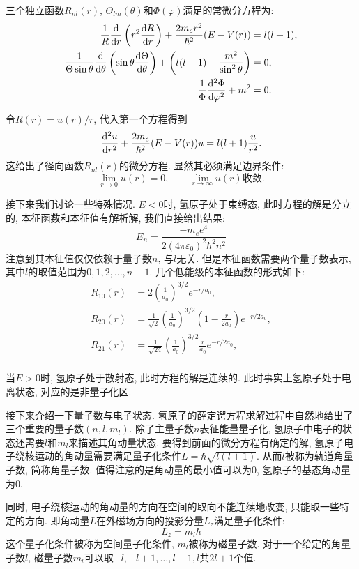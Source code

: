 三个独立函数$R_{nl}(r)$, $\Theta_{lm}(\theta)$和$\Phi(\varphi)$满足的常微分方程为:
\[
\begin{aligned}
\frac{1}{R}\frac{\d}{\d r}\left(r^2\frac{\d R}{\d r}\right) + \frac{2m_e r^2}{\hbar^2}(E-V(r)) &= l(l+1), \\
\frac{1}{\Theta \sin\theta}\frac{\d}{\d\theta}\left(\sin\theta \frac{\d\Theta}{\d\theta}\right) + \left(l(l+1) - \frac{m^2}{\sin^2\theta}\right) &= 0, \\
\frac{1}{\Phi}\frac{\d^2\Phi}{\d\varphi^2} + m^2 &= 0.
\end{aligned}
\]

令$R(r) = u(r)/r$, 代入第一个方程得到
\[
\frac{\mathop{}\!\mathrm{d}^2u}{\mathop{}\!\mathrm{d} r^2} + \frac{2m_e}{\hbar^2}(E-V(r))u = l(l+1)\frac{u}{r^2}.
\]
这给出了径向函数$R_{nl}(r)$的微分方程. 显然其必须满足边界条件:
\[
\lim_{r\to 0} u(r) = 0, \qquad \lim_{r\to \infty} u(r) \text{收敛}.
\]

接下来我们讨论一些特殊情况. $E<0$时, 氢原子处于束缚态, 此时方程的解是分立的, 本征函数和本征值有解析解, 我们直接给出结果:
\[
E_n = \frac{-m_e e^4}{2(4\pi\varepsilon_0)^2 \hbar^2 n^2}
\]
注意到其本征值仅仅依赖于量子数$n$, 与$l$无关. 但是本征函数需要两个量子数表示, 其中$l$的取值范围为$0, 1, 2, \ldots, n-1$. 几个低能级的本征函数的形式如下:
\[
\begin{aligned}
  R_{10}(r) &= 2\left(\frac{1}{a_0}\right)^{3/2} e^{-r/a_0}, \\
  R_{20}(r) &= \frac{1}{\sqrt{2}}\left(\frac{1}{a_0}\right)^{3/2} \left(1-\frac{r}{2a_0}\right)e^{-r/2a_0}, \\
  R_{21}(r) &= \frac{1}{\sqrt{24}}\left(\frac{1}{a_0}\right)^{3/2} \frac{r}{a_0} e^{-r/2a_0}, \\
\end{aligned}
\]

当$E>0$时, 氢原子处于散射态, 此时方程的解是连续的. 此时事实上氢原子处于电离状态, 对应的是非量子化区.

接下来介绍一下量子数与电子状态. 氢原子的薛定谔方程求解过程中自然地给出了三个重要的量子数$(n, l, m_l)$. 除了主量子数$n$表征能量量子化, 氢原子中电子的状态还需要$l$和$m_l$来描述其角动量状态. 要得到前面的微分方程有确定的解, 氢原子电子绕核运动的角动量需要满足量子化条件$L=\hbar\sqrt{l(l+1)}$. 从而$l$被称为轨道角量子数, 简称角量子数. 值得注意的是角动量的最小值可以为$0$, 氢原子的基态角动量为$0$.

同时, 电子绕核运动的角动量的方向在空间的取向不能连续地改变, 只能取一些特定的方向. 即角动量$L$在外磁场方向的投影分量$L_z$满足量子化条件:
\[
L_z = m_l \hbar
\]
这个量子化条件被称为空间量子化条件, $m_l$被称为磁量子数. 对于一个给定的角量子数$l$, 磁量子数$m_l$可以取$-l, -l+1, \ldots, l-1, l$共$2l+1$个值.

